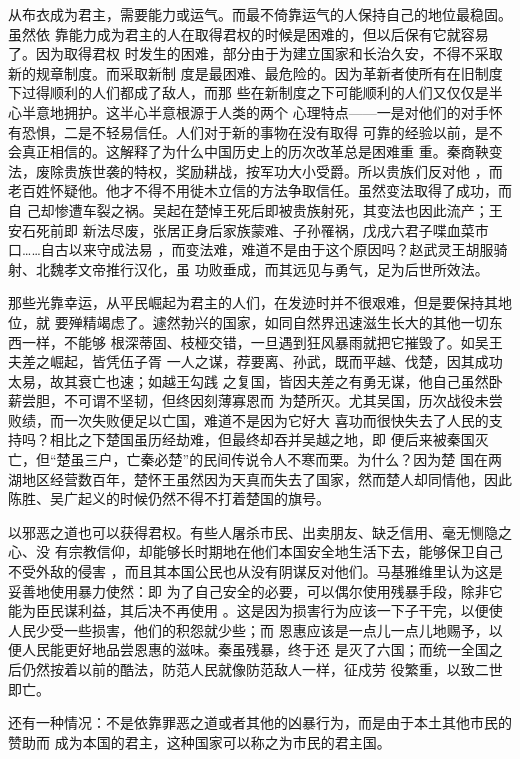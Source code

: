 从布衣成为君主，需要能力或运气。而最不倚靠运气的人保持自己的地位最稳固。虽然依
靠能力成为君主的人在取得君权的时候是困难的，但以后保有它就容易了。因为取得君权
时发生的困难，部分由于为建立国家和长治久安，不得不采取新的规章制度。而采取新制
度是最困难、最危险的。因为革新者使所有在旧制度下过得顺利的人们都成了敌人，而那
些在新制度之下可能顺利的人们又仅仅是半心半意地拥护。这半心半意根源于人类的两个
心理特点——一是对他们的对手怀有恐惧，二是不轻易信任。人们对于新的事物在没有取得
可靠的经验以前，是不会真正相信的。这解释了为什么中国历史上的历次改革总是困难重
重。秦商鞅变法，废除贵族世袭的特权，奖励耕战，按军功大小受爵。所以贵族们反对他
，而老百姓怀疑他。他才不得不用徙木立信的方法争取信任。虽然变法取得了成功，而自
己却惨遭车裂之祸。吴起在楚悼王死后即被贵族射死，其变法也因此流产；王安石死前即
新法尽废，张居正身后家族蒙难、子孙罹祸，戊戌六君子喋血菜市口……自古以来守成法易
，而变法难，难道不是由于这个原因吗？赵武灵王胡服骑射、北魏孝文帝推行汉化，虽
功败垂成，而其远见与勇气，足为后世所效法。

那些光靠幸运，从平民崛起为君主的人们，在发迹时并不很艰难，但是要保持其地位，就
要殚精竭虑了。遽然勃兴的国家，如同自然界迅速滋生长大的其他一切东西一样，不能够
根深蒂固、枝桠交错，一旦遇到狂风暴雨就把它摧毁了。如吴王夫差之崛起，皆凭伍子胥
一人之谋，荐要离、孙武，既而平越、伐楚，因其成功太易，故其衰亡也速；如越王勾践
之复国，皆因夫差之有勇无谋，他自己虽然卧薪尝胆，不可谓不坚韧，但终因刻薄寡恩而
为楚所灭。尤其吴国，历次战役未尝败绩，而一次失败便足以亡国，难道不是因为它好大
喜功而很快失去了人民的支持吗？相比之下楚国虽历经劫难，但最终却吞并吴越之地，即
便后来被秦国灭亡，但“楚虽三户，亡秦必楚”的民间传说令人不寒而栗。为什么？因为楚
国在两湖地区经营数百年，楚怀王虽然因为天真而失去了国家，然而楚人却同情他，因此
陈胜、吴广起义的时候仍然不得不打着楚国的旗号。

以邪恶之道也可以获得君权。有些人屠杀市民、出卖朋友、缺乏信用、毫无恻隐之心、没
有宗教信仰，却能够长时期地在他们本国安全地生活下去，能够保卫自己不受外敌的侵害
，而且其本国公民也从没有阴谋反对他们。马基雅维里认为这是妥善地使用暴力使然：即
为了自己安全的必要，可以偶尔使用残暴手段，除非它能为臣民谋利益，其后决不再使用
。这是因为损害行为应该一下子干完，以便使人民少受一些损害，他们的积怨就少些；而
恩惠应该是一点儿一点儿地赐予，以便人民能更好地品尝恩惠的滋味。秦虽残暴，终于还
是灭了六国；而统一全国之后仍然按着以前的酷法，防范人民就像防范敌人一样，征戍劳
役繁重，以致二世即亡。

还有一种情况：不是依靠罪恶之道或者其他的凶暴行为，而是由于本土其他市民的赞助而
成为本国的君主，这种国家可以称之为市民的君主国。

